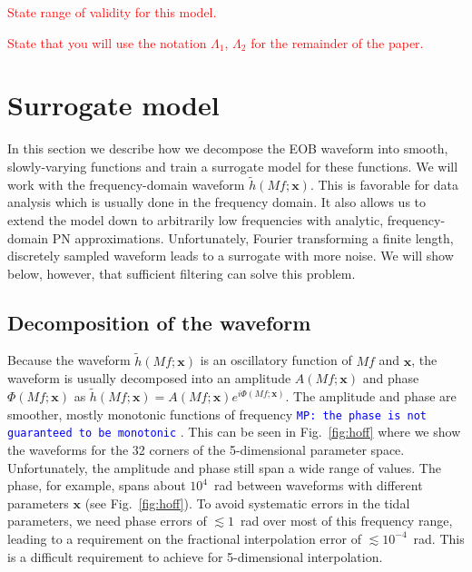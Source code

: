 \documentclass[prd,aps,letter,twocolumn,floatfix,notitlepage,nofootinbib]{revtex4-1}
\def\bx{\mathbf{x}}
\newcommand{\MP}[1]{{\textcolor{blue}{\texttt{MP: #1}} }}
\newcommand{\red}[1]{\textcolor{red}{#1}}
\begin{document}
\red{State range of validity for this model.}

\red{State that you will use the notation $\Lambda_1$, $\Lambda_2$ for the remainder of the paper.}

\section{Surrogate model}

In this section we describe how we decompose the EOB waveform into smooth, slowly-varying functions and train a surrogate model for these functions. We will work with the frequency-domain waveform $\tilde h(Mf; \bx)$. This is favorable for data analysis which is usually done in the frequency domain. It also allows us to extend the model down to arbitrarily low frequencies with analytic, frequency-domain PN approximations. Unfortunately, Fourier transforming a finite length, discretely sampled waveform leads to a surrogate with more noise. We will show below, however, that sufficient filtering can solve this problem.


\subsection{Decomposition of the waveform}

Because the waveform $\tilde h(Mf; \bx)$ is an oscillatory function of $Mf$ and $\bx$, the waveform is usually decomposed into an amplitude $A(Mf; \bx)$ and phase $\Phi(Mf; \bx)$ as $\tilde h(Mf; \bx) = A(Mf; \bx) e^{i\Phi(Mf; \bx)}$. The amplitude and phase are smoother, mostly monotonic functions of frequency \MP{the phase is not guaranteed to be monotonic}. This can be seen in Fig.~\ref{fig:hoff} where we show the waveforms for the 32 corners of the 5-dimensional parameter space. Unfortunately, the amplitude and phase still span a wide range of values. The phase, for example, spans about $10^4$~rad between waveforms with different parameters $\bx$ (see Fig.~\ref{fig:hoff}). To avoid systematic errors in the tidal parameters, we need phase errors of $\lesssim 1$~rad over most of this frequency range, leading to a requirement on the fractional interpolation error of $\lesssim 10^{-4}$~rad. This is a difficult requirement to achieve for 5-dimensional interpolation. 
\end{document}
